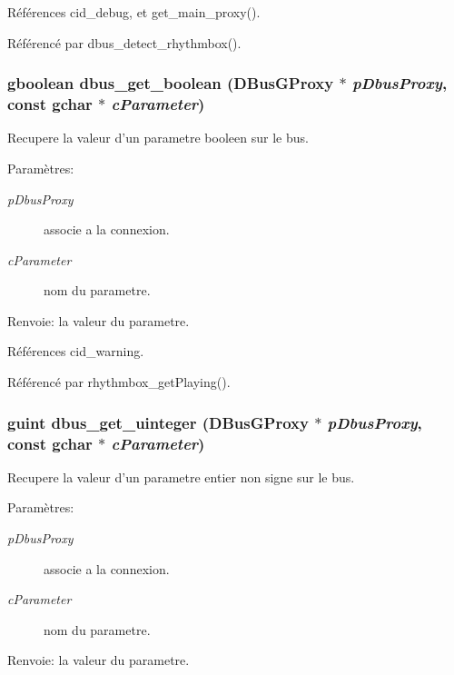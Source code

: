 Références cid\_\-debug, et get\_\-main\_\-proxy().

Référencé par dbus\_\-detect\_\-rhythmbox().
\subsubsection{\setlength{\rightskip}{0pt plus 5cm}gboolean dbus\_\-get\_\-boolean (DBusGProxy $\ast$ {\em pDbusProxy}, \/  const gchar $\ast$ {\em cParameter})}\label{cid-dbus_8h_d22399e4bc5784a6ca2679f32707f61a}


Recupere la valeur d'un parametre booleen sur le bus. \begin{Desc}
\item[Paramètres:]
\begin{description}
\item[{\em pDbusProxy}]associe a la connexion. \item[{\em cParameter}]nom du parametre. \end{description}
\end{Desc}
\begin{Desc}
\item[Renvoie:]la valeur du parametre. \end{Desc}


Références cid\_\-warning.

Référencé par rhythmbox\_\-getPlaying().
\subsubsection{\setlength{\rightskip}{0pt plus 5cm}guint dbus\_\-get\_\-uinteger (DBusGProxy $\ast$ {\em pDbusProxy}, \/  const gchar $\ast$ {\em cParameter})}\label{cid-dbus_8h_a0f6943fc8a248106a3453c6c9e35eb1}


Recupere la valeur d'un parametre entier non signe sur le bus. \begin{Desc}
\item[Paramètres:]
\begin{description}
\item[{\em pDbusProxy}]associe a la connexion. \item[{\em cParameter}]nom du parametre. \end{description}
\end{Desc}
\begin{Desc}
\item[Renvoie:]la valeur du parametre. \end{Desc}


